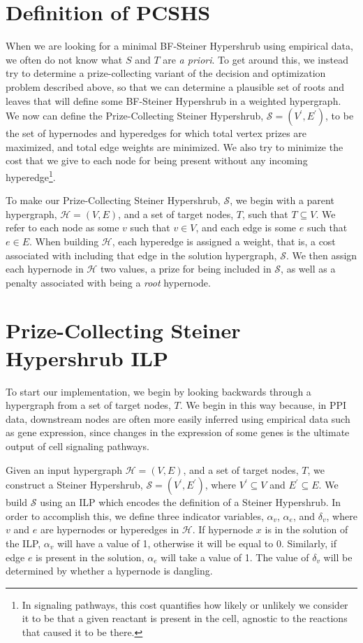 \documentclass[12pt,twoside]{reedthesis}
\theoremstyle{definition}
\begin{document}
\section{Definition of PCSHS}

When we are looking for a minimal BF-Steiner Hypershrub using empirical data, we often do not know what $S$ and $T$ are \textit{a priori}. To get around this, we instead try to determine a prize-collecting variant of the decision and optimization problem described above, so that we can determine a plausible set of roots and leaves that will define some BF-Steiner Hypershrub in a weighted hypergraph. We now can define the Prize-Collecting Steiner Hypershrub, $\mathcal{S} = (V^\prime,E^\prime)$, to be the set of hypernodes and hyperedges for which total vertex prizes are maximized, and total edge weights are minimized. We also try to minimize the cost that we give to each node for being present without any incoming hyperedge\footnote{In signaling pathways, this cost quantifies how likely or unlikely we consider it to be that a given reactant is present in the cell, agnostic to the reactions that caused it to be there.}.

To make our Prize-Collecting Steiner Hypershrub, $\mathcal{S}$, we begin with a parent hypergraph, $\mathcal{H} = (V,E)$, and a set of target nodes, $T$, such that $T \subseteq V$.  We refer to each node as some $v$ such that $v \in V$, and each edge is some $e$ such that $e \in E$.  When building $\mathcal{H}$, each hyperedge is assigned a weight, that is, a cost associated with including that edge in the solution hypergraph, $\mathcal{S}$.  We then assign each hypernode in $\mathcal{H}$ two values, a prize for being included in $\mathcal{S}$, as well as a penalty associated with being a \textit{root} hypernode.\par

\section{Prize-Collecting Steiner Hypershrub ILP}

To start our implementation, we begin by looking backwards through a hypergraph from a set of target nodes, $T$. We begin in this way because, in PPI data, downstream nodes are often more easily inferred using empirical data such as gene expression, since changes in the expression of some genes is the ultimate output of cell signaling pathways.

Given an input hypergraph $\mathcal{H}=(V,E)$, and a set of target nodes, $T$, we construct a Steiner Hypershrub, $\mathcal{S}= (V^\prime,E^\prime)$, where $V^\prime \subseteq V$ and $E^\prime \subseteq E$.  We build $\mathcal{S}$ using an ILP which encodes the definition of a Steiner Hypershrub.  In order to accomplish this, we define three indicator variables, $\alpha_v$, $\alpha_e$, and $\delta_v$, where $v$ and $e$ are hypernodes or hyperedges in $\mathcal{H}$.  If hypernode $x$ is in the solution of the ILP, $\alpha_v$ will have a value of 1, otherwise it will be equal to 0.  Similarly, if edge $e$ is present in the solution, $\alpha_e$ will take a value of 1. The value of $\delta_v$ will be determined by whether a hypernode is dangling.\par
\end{document}
